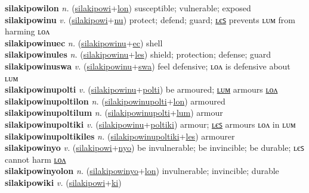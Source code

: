 \textbf{silakipowilon} \textit{n.} (\hyperref[silakipowi]{silakipowi}+\hyperref[lon]{lon})
susceptible; vulnerable; exposed \label{silakipowilon} \\
\textbf{silakipowinu} \textit{v.} (\hyperref[silakipowi]{silakipowi}+\hyperref[nu]{nu})
protect; defend; guard; \hyperref[silakipowinules]{ʟєꜱ} prevents ʟᴜᴍ from harming ʟᴏᴧ \label{silakipowinu} \\
\textbf{silakipowinuec} \textit{n.} (\hyperref[silakipowinu]{silakipowinu}+\hyperref[ec]{ec})
shell \label{silakipowinuec} \\
\textbf{silakipowinules} \textit{n.} (\hyperref[silakipowinu]{silakipowinu}+\hyperref[les]{les})
shield; protection; defense; guard \label{silakipowinules} \\
\textbf{silakipowinuswa} \textit{v.} (\hyperref[silakipowinu]{silakipowinu}+\hyperref[swa]{swa})
feel defensive; ʟᴏᴧ is defensive about ʟᴜᴍ \label{silakipowinuswa} \\
\textbf{silakipowinupolti} \textit{v.} (\hyperref[silakipowinu]{silakipowinu}+\hyperref[polti]{polti})
be armoured; \hyperref[silakipowinupoltilum]{ʟᴜᴍ} armours \hyperref[silakipowinupoltilon]{ʟᴏᴧ} \label{silakipowinupolti} \\
\textbf{silakipowinupoltilon} \textit{n.} (\hyperref[silakipowinupolti]{silakipowinupolti}+\hyperref[lon]{lon})
armoured \label{silakipowinupoltilon} \\
\textbf{silakipowinupoltilum} \textit{n.} (\hyperref[silakipowinupolti]{silakipowinupolti}+\hyperref[lum]{lum})
armour \label{silakipowinupoltilum} \\
\textbf{silakipowinupoltiki} \textit{v.} (\hyperref[silakipowinu]{silakipowinu}+\hyperref[poltiki]{poltiki})
armour; \hyperref[silakipowinupoltikiles]{ʟєꜱ} armours ʟᴏᴧ in ʟᴜᴍ \label{silakipowinupoltiki} \\
\textbf{silakipowinupoltikiles} \textit{n.} (\hyperref[silakipowinupoltiki]{silakipowinupoltiki}+\hyperref[les]{les})
armourer \label{silakipowinupoltikiles} \\
\textbf{silakipowinyo} \textit{v.} (\hyperref[silakipowi]{silakipowi}+\hyperref[nyo]{nyo})
be invulnerable; be invincible; be durable; ʟєꜱ cannot harm \hyperref[silakipowinyolon]{ʟᴏᴧ} \label{silakipowinyo} \\
\textbf{silakipowinyolon} \textit{n.} (\hyperref[silakipowinyo]{silakipowinyo}+\hyperref[lon]{lon})
invulnerable; invincible; durable \label{silakipowinyolon} \\
\textbf{silakipowiki} \textit{v.} (\hyperref[silakipowi]{silakipowi}+\hyperref[ki]{ki})
